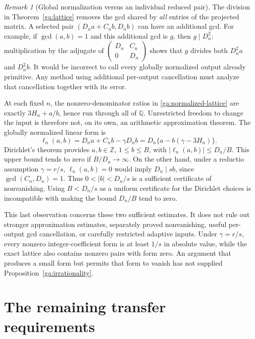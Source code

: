 \documentclass[11pt,a4paper]{article}
\numberwithin{equation}{section}
\theoremstyle{definition}
\theoremstyle{remark}
\newtheorem{remark}[theorem]{Remark}
\newcommand{\Q}{\mathbb Q}
\newcommand{\Z}{\mathbb Z}
\begin{document}
\begin{remark}[Global normalization versus an individual reduced pair]
\label{ga:individual}
The division in Theorem~\ref{ga:lattice} removes the gcd shared by
\emph{all} entries of the projected matrix.  A selected pair
$(D_na+C_nb,D_nb)$ can have an additional gcd.
For example, if $\gcd(a,b)=1$ and this additional gcd is $g$, then
$g\mid D_n^2$: multiplication by the adjugate of
$\left(\begin{smallmatrix}D_n&C_n\\0&D_n\end{smallmatrix}\right)$
shows that $g$ divides both $D_n^2a$ and $D_n^2b$.
It would be incorrect to call every globally normalized output
already primitive.  Any method using additional per-output
cancellation must analyze that cancellation together with its error.
\end{remark}

At each fixed $n$, the nonzero-denominator ratios in
\eqref{ga:normalized-lattice} are exactly
$3H_n+a/b$, hence run through all of $\Q$.
Unrestricted freedom to change the input is therefore not, on its own,
an arithmetic approximation theorem.
The globally normalized linear form is
\begin{equation}\label{ga:CMF-form}
 \ell_n(a,b)=D_na+C_nb-\gamma D_nb
           =D_n\{a-b(\gamma-3H_n)\}.
\end{equation}
Dirichlet's theorem provides $a,b\in\Z$, $1\le b\le B$,
with $|\ell_n(a,b)|\le D_n/B$.
This upper bound tends to zero if $B/D_n\to\infty$.
On the other hand, under a reductio assumption $\gamma=r/s$,
$\ell_n(a,b)=0$ would imply $D_n\mid sb$, since
$\gcd(C_n,D_n)=1$.
Thus $0<|b|<D_n/s$ is a sufficient certificate of nonvanishing.
Using $B<D_n/s$ as a uniform certificate for the Dirichlet choices
is incompatible with making the bound $D_n/B$ tend to zero.

This last observation concerns these two sufficient estimates.
It does not rule out stronger approximation estimates, separately
proved nonvanishing, useful per-output gcd cancellation, or carefully
restricted adaptive inputs.  Under $\gamma=r/s$, every nonzero
integer-coefficient form is at least $1/s$ in absolute value,
while the exact lattice also contains nonzero pairs with form zero.
An argument that produces a small form but permits that form to
vanish has not supplied Proposition~\ref{ga:irrationality}.

\section{The remaining transfer requirements}
\label{end:interfaces}
\end{document}
